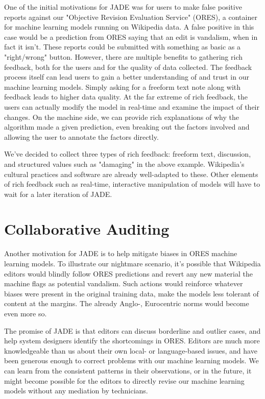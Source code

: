 \documentclass{sigchi-ext}
\begin{document}
One of the initial motivations for JADE was for users to make false positive reports against our "Objective Revision Evaluation Service" (ORES), a container for machine learning models running on Wikipedia data.  A false positive in this case would be a prediction from ORES saying that an edit is vandalism, when in fact it isn't.  These reports could be submitted with something as basic as a "right/wrong" button.  However, there are multiple benefits to gathering rich feedback, both for the users and for the quality of data collected.  The feedback process itself can lead users to gain a better understanding of and trust in our machine learning models.  Simply asking for a freeform text note along with feedback leads to higher data quality.  At the far extreme of rich feedback, the users can actually modify the model in real-time and examine the impact of their changes.\cite{amershi2014power} \cite{stumpf2009interacting}  On the machine side, we can provide rich explanations of why the algorithm made a given prediction, even breaking out the factors involved and allowing the user to annotate the factors directly.

We've decided to collect three types of rich feedback: freeform text, discussion, and structured values such as "damaging" in the above example.  Wikipedia's cultural practices and software are already well-adapted to these.  Other elements of rich feedback such as real-time, interactive manipulation of models will have to wait for a later iteration of JADE.

\section{Collaborative Auditing}

Another motivation for JADE is to help mitigate biases in ORES machine learning models.  To illustrate our nightmare scenario, it's possible that Wikipedia editors would blindly follow ORES predictions and revert any new material the machine flags as potential vandalism.  Such actions would reinforce whatever biases were present in the original training data, make the models less tolerant of content at the margins.  The already Anglo-, Eurocentric norms\cite{ford2013getting} would become even more so.

The promise of JADE is that editors can discuss borderline and outlier cases, and help system designers identify the shortcomings in ORES.  Editors are much more knowledgeable than us about their own local- or language-based issues, and have been generous enough to correct problems with our machine learning models.  We can learn from the consistent patterns in their observations, or in the future, it might become possible for the editors to directly revise our machine learning models without any mediation by technicians.
\end{document}
